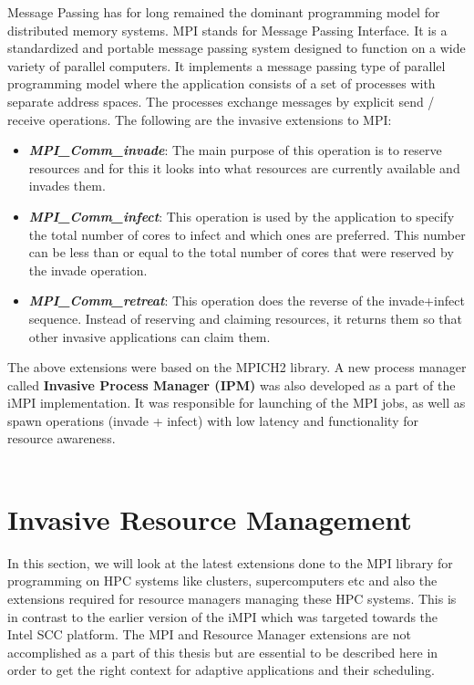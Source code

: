 Message Passing has for long remained the dominant programming model for distributed memory systems. MPI stands for Message Passing Interface. It is a standardized and portable message passing system designed to function on a wide variety of parallel computers. It implements a message passing type of parallel programming model where the application consists of a set of processes with separate address spaces. The processes exchange messages by explicit send / receive operations. The following are the invasive extensions to MPI:
\begin{itemize}
\item \textbf{\textit{MPI\_Comm\_invade}}: The main purpose of this operation is to reserve resources and for this it looks into what resources are currently available and invades them.
\item \textbf{\textit{MPI\_Comm\_infect}}: This operation is used by the application to specify the total number of cores to infect and which ones are preferred. This number can be less than or equal to the total number of cores that were reserved by the invade operation. 
\item \textbf{\textit{MPI\_Comm\_retreat}}: This operation does the reverse of the invade+infect sequence. Instead of reserving and claiming resources, it returns them so that other invasive applications can claim them.
\end{itemize}
The above extensions were based on the MPICH2 library. A new process manager called \textbf{Invasive Process Manager (IPM)} was also developed as a part of the iMPI implementation. It was responsible for launching of the MPI jobs, as well as spawn operations (invade + infect) with low latency and functionality for resource awareness.\\ \\
\section{Invasive Resource Management}
In this section, we will look at the latest extensions done to the MPI library for programming on HPC systems like clusters, supercomputers etc and also the extensions required for resource managers managing these HPC systems. This is in contrast to the earlier version of the iMPI which was targeted towards the Intel SCC platform. The MPI and Resource Manager extensions are not accomplished as a part of this thesis but are essential to be described here in order to get the right context for adaptive applications and their scheduling.
